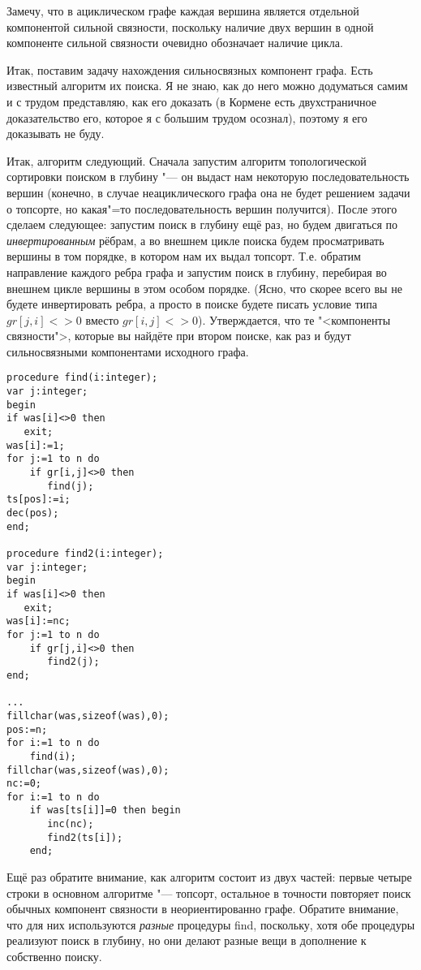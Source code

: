 Замечу, что в ациклическом графе каждая вершина является отдельной компонентой сильной связности, поскольку наличие двух
вершин в одной компоненте сильной связности очевидно обозначает наличие цикла.

Итак, поставим задачу нахождения сильносвязных компонент графа. Есть известный алгоритм их поиска. Я не знаю,
как до него можно додуматься самим и с трудом представляю, как его доказать (в Кормене есть двухстраничное 
доказательство его, которое я с большим трудом осознал), поэтому я его доказывать не буду.

Итак, алгоритм следующий. Сначала запустим алгоритм топологической сортировки поиском в глубину "--- он выдаст 
нам некоторую последовательность вершин (конечно, в случае неациклического графа она не будет решением задачи о топсорте, 
но какая"=то последовательность вершин получится). После этого сделаем следующее: запустим поиск в глубину ещё раз, но будем
двигаться по \textit{инвертированным} рёбрам, а во внешнем цикле поиска будем просматривать вершины в том порядке, 
в котором нам их выдал топсорт. Т.е. обратим направление каждого ребра графа и запустим поиск в глубину, перебирая 
во внешнем цикле вершины в этом особом порядке. (Ясно, что скорее всего вы не будете инвертировать ребра,
а просто в поиске будете писать условие типа $gr[j,i]<>0$ вместо $gr[i,j]<>0$). Утверждается, что те "<компоненты
связности">, которые вы найдёте при втором поиске, как раз и будут сильносвязными компонентами исходного графа.

\begin{codesamplec}{3}\begin{verbatim}
procedure find(i:integer);
var j:integer;
begin
if was[i]<>0 then
   exit;
was[i]:=1;
for j:=1 to n do
    if gr[i,j]<>0 then
       find(j);
ts[pos]:=i;
dec(pos);
end;

procedure find2(i:integer);
var j:integer;
begin
if was[i]<>0 then
   exit;
was[i]:=nc;
for j:=1 to n do
    if gr[j,i]<>0 then
       find2(j);
end;

...
fillchar(was,sizeof(was),0);
pos:=n;
for i:=1 to n do
    find(i);
fillchar(was,sizeof(was),0);
nc:=0;
for i:=1 to n do
    if was[ts[i]]=0 then begin
       inc(nc);
       find2(ts[i]);
    end;
\end{verbatim}\end{codesamplec}

Ещё раз обратите внимание, как алгоритм состоит из двух частей: первые четыре строки в основном алгоритме "--- топсорт,
остальное в точности повторяет поиск обычных компонент связности в неориентированно графе. Обратите внимание, что для
них используются \textit{разные} процедуры find, поскольку, хотя обе процедуры реализуют поиск в глубину,
но они делают разные вещи в дополнение к собственно поиску. 

